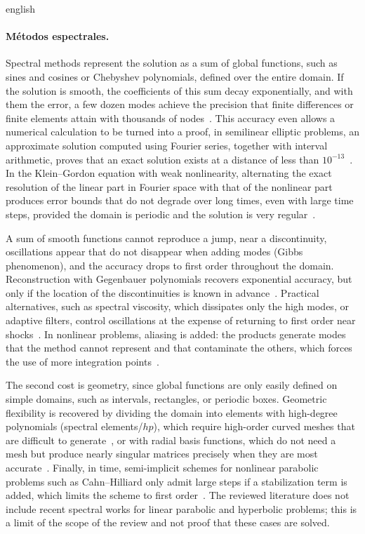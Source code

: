 \documentclass[../0000.tex]{subfiles}
\begin{document}
\begin{hyphenrules}{english}
\paragraph{Métodos espectrales.}
Spectral methods represent the solution as a sum of global functions, such as sines and cosines or Chebyshev polynomials, defined over the entire domain. 
If the solution is smooth, the coefficients of this sum decay exponentially, and with them the error, a few dozen modes achieve the precision that finite 
differences or finite elements attain with thousands of nodes~\cite{xu2018spectral}. This accuracy even allows a numerical calculation to be turned into a 
proof, in semilinear elliptic problems, an approximate solution computed using Fourier series, together with interval arithmetic, proves that an exact solution 
exists at a distance of less than $10^{-13}$~\cite{cadiot2024rigorous}. In the Klein–Gordon equation with weak nonlinearity, alternating the exact resolution of 
the linear part in Fourier space with that of the nonlinear part produces error bounds that do not degrade over long times, even with large time steps, 
provided the domain is periodic and the solution is very regular~\cite{bao2022uniform}.

A sum of smooth functions cannot reproduce a jump, near a discontinuity, oscillations appear that do not disappear when adding modes (Gibbs phenomenon), and 
the accuracy drops to first order throughout the domain. Reconstruction with Gegenbauer polynomials recovers exponential accuracy, but only if the location of 
the discontinuities is known in advance~\cite{gottlieb1997gibbs}. Practical alternatives, such as spectral viscosity, which dissipates only the high modes, or 
adaptive filters, control oscillations at the expense of returning to first order near shocks~\cite{tadmor2012review,dzanic2022positivity}. In nonlinear problems, 
aliasing is added: the products generate modes that the method cannot represent and that contaminate the others, which forces the use of more integration 
points~\cite{xu2018spectral}.

The second cost is geometry, since global functions are only easily defined on simple domains, such as intervals, rectangles, or periodic boxes. Geometric 
flexibility is recovered by dividing the domain into elements with high-degree polynomials (spectral elements/$hp$), which require high-order curved meshes 
that are difficult to generate~\cite{xu2018spectral}, or with radial basis functions, which do not need a mesh but produce nearly singular matrices precisely when 
they are most accurate~\cite{fornberg2015solving}. Finally, in time, semi-implicit schemes for nonlinear parabolic problems such as Cahn–Hilliard only admit large 
steps if a stabilization term is added, which limits the scheme to first order~\cite{li2022large}. The reviewed literature does not include recent spectral works 
for linear parabolic and hyperbolic problems; this is a limit of the scope of the review and not proof that these cases are solved.


\end{hyphenrules}
\end{document}
